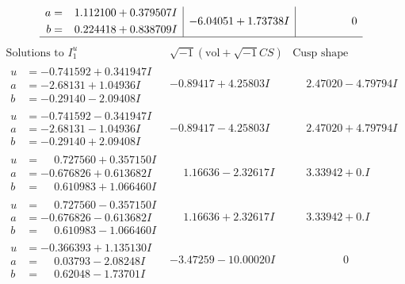 \documentclass[1p]{elsarticle_modified}
\theoremstyle{definition}
\newcommand{\I}{\sqrt{-1}}
\begin{document}
$$\begin{array}{c|c|c}
\begin{aligned}
a &= \phantom{-}1.112100 + 0.379507 I \\
b &= \phantom{-}0.224418 + 0.838709 I\end{aligned}
 & -6.04051 + 1.73738 I & \phantom{-0.000000 } 0\\
 \hline 
 \end{array}$$\newpage$$\begin{array}{c|c|c}  
\text{Solutions to }I^u_{1}& \I (\text{vol} + \sqrt{-1}CS) & \text{Cusp shape}\\
 \hline 
\begin{aligned}
u &= -0.741592 + 0.341947 I \\
a &= -2.68131 + 1.04936 I \\
b &= -0.29140 - 2.09408 I\end{aligned}
 & -0.89417 + 4.25803 I & \phantom{-}2.47020 - 4.79794 I \\ \hline\begin{aligned}
u &= -0.741592 - 0.341947 I \\
a &= -2.68131 - 1.04936 I \\
b &= -0.29140 + 2.09408 I\end{aligned}
 & -0.89417 - 4.25803 I & \phantom{-}2.47020 + 4.79794 I \\ \hline\begin{aligned}
u &= \phantom{-}0.727560 + 0.357150 I \\
a &= -0.676826 + 0.613682 I \\
b &= \phantom{-}0.610983 + 1.066460 I\end{aligned}
 & \phantom{-}1.16636 - 2.32617 I & \phantom{-}3.33942 + 0. I\phantom{ +0.000000I} \\ \hline\begin{aligned}
u &= \phantom{-}0.727560 - 0.357150 I \\
a &= -0.676826 - 0.613682 I \\
b &= \phantom{-}0.610983 - 1.066460 I\end{aligned}
 & \phantom{-}1.16636 + 2.32617 I & \phantom{-}3.33942 + 0. I\phantom{ +0.000000I} \\ \hline\begin{aligned}
u &= -0.366393 + 1.135130 I \\
a &= \phantom{-}0.03793 - 2.08248 I \\
b &= \phantom{-}0.62048 - 1.73701 I\end{aligned}
 & -3.47259 - 10.00020 I & \phantom{-0.000000 } 0 \\ \hline\begin{aligned}

\end{aligned}
\end{array}$$
\end{document}
